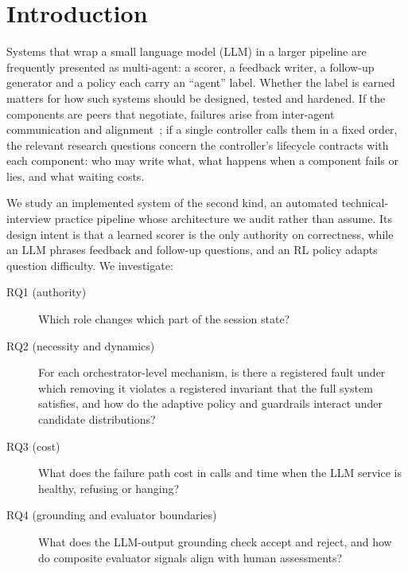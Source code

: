 \documentclass[runningheads]{llncs}
\begin{document}
\section{Introduction}
Systems that wrap a small language model (LLM) in a larger pipeline are frequently presented as multi-agent: a scorer, a feedback writer, a follow-up generator and a policy each carry an ``agent'' label. Whether the label is earned matters for how such systems should be designed, tested and hardened. If the components are peers that negotiate, failures arise from inter-agent communication and alignment~\cite{mast}; if a single controller calls them in a fixed order, the relevant research questions concern the controller's lifecycle contracts with each component: who may write what, what happens when a component fails or lies, and what waiting costs.

We study an implemented system of the second kind, an automated technical-interview practice pipeline whose architecture we audit rather than assume. Its design intent is that a learned scorer is the only authority on correctness, while an LLM phrases feedback and follow-up questions, and an RL policy adapts question difficulty. We investigate:

\begin{description}
\item[RQ1 (authority)] Which role changes which part of the session state?
\item[RQ2 (necessity and dynamics)] For each orchestrator-level mechanism, is there a registered fault under which removing it violates a registered invariant that the full system satisfies, and how do the adaptive policy and guardrails interact under candidate distributions?
\item[RQ3 (cost)] What does the failure path cost in calls and time when the LLM service is healthy, refusing or hanging?
\item[RQ4 (grounding and evaluator boundaries)] What does the LLM-output grounding check accept and reject, and how do composite evaluator signals align with human assessments?
\end{description}
\end{document}
